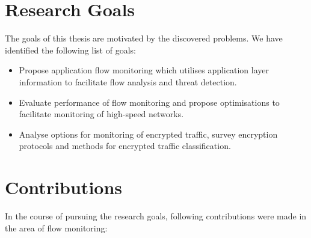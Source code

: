\section{Research Goals}

The goals of this thesis are motivated by the discovered problems. We have identified the following list of goals:

\begin{itemize}
  \item Propose application flow monitoring which utilises application layer information to facilitate flow analysis and threat detection.
  \item Evaluate performance of flow monitoring and propose optimisations to facilitate monitoring of high-speed networks.
  \item Analyse options for monitoring of encrypted traffic, survey encryption protocols and methods for encrypted traffic classification.
\end{itemize}


\section{Contributions}

In the course of pursuing the research goals, following contributions were made in the area of flow monitoring:

